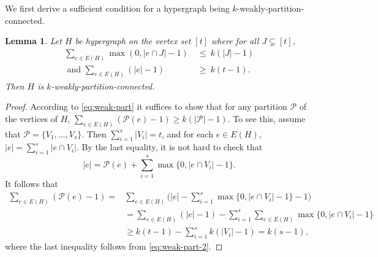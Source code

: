\documentclass[11pt]{article}
\newtheorem{lemma}[theorem]{Lemma}
\begin{document}
We first derive a sufficient condition for a hypergraph being $k$-weakly-partition-connected.

\begin{lemma}
  \label{lem:rand-2}
  Let $H$ be hypergraph on the vertex set $[t]$ where for all $J\subsetneq [t]$,
  \begin{align}
    \label{eq:weak-part-2}
    \sum_{e\in E(H)}^{} \max(0,|e\cap J|-1) \ &\le \   k(|J|-1) \nonumber\\
    \text{~and~} \sum_{e\in E(H)}^{} (|e|-1) \ &\ge \   k(t-1).
  \end{align}
  Then $H$ is $k$-weakly-partition-connected.
\end{lemma}

\begin{proof}
According to \eqref{eq:weak-part} it suffices to show that for any partition $\mathcal{P}$ of the vertices of $H$, $\sum_{e\in E(H)}(\mathcal{P}(e)-1)\ge k(|\mathcal{P}|-1)$.
To see this, assume that $\mathcal{P}=\{V_1,\ldots,V_s\}$. Then $\sum_{i=1}^s |V_i|=t$, and for each $e\in E(H)$, $|e|=\sum_{i=1}^s |e\cap V_i|$. By the last equality, it is not hard to check that
\begin{equation*}
    |e|=\mathcal{P}(e)+\sum_{i=1}^s \max\{0,|e\cap V_i|-1\}.
\end{equation*}
It follows that
\begin{equation*}
\begin{aligned}
    \sum_{e\in E(H)} (\mathcal{P}(e)-1)=&\sum_{e\in E(H)} \Big(|e|-\sum_{i=1}^s \max\{0,|e\cap V_i|-1\}-1\Big)\\
    &= \sum_{e\in E(H)} (|e|-1)-\sum_{i=1}^s\sum_{e\in E(H)} \max\{0,|e\cap V_i|-1\}\\
    &\ge k(t-1)-\sum_{i=1}^s k(|V_i|-1)=k(s-1),
\end{aligned}
\end{equation*}
where the last inequality follows from \eqref{eq:weak-part-2}.
\end{proof}
\end{document}
